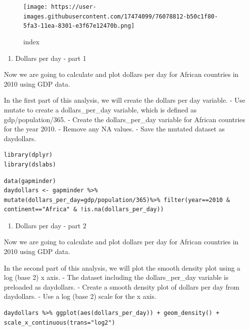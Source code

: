 \documentclass[
]{article}
\providecommand{\tightlist}{%
  \setlength{\itemsep}{0pt}\setlength{\parskip}{0pt}}
\begin{document}
\begin{figure}
\centering
\texttt{[image: https://user-images.githubusercontent.com/17474099/76078812-b50c1f80-5fa3-11ea-8301-e3f67e12470b.png]}
\caption{index}
\end{figure}

\begin{enumerate}
\def\labelenumi{\arabic{enumi}.}
\setcounter{enumi}{6}
\tightlist
\item
  Dollars per day - part 1
\end{enumerate}

Now we are going to calculate and plot dollars per day for African
countries in 2010 using GDP data.

In the first part of this analysis, we will create the dollars per day
variable. - Use mutate to create a dollars\_per\_day variable, which is
defined as gdp/population/365. - Create the dollars\_per\_day variable
for African countries for the year 2010. - Remove any NA values. - Save
the mutated dataset as daydollars.

\begin{verbatim}
library(dplyr)
library(dslabs)
\end{verbatim}

\begin{verbatim}
data(gapminder)
daydollars <- gapminder %>% mutate(dollars_per_day=gdp/population/365)%>% filter(year==2010 & continent=="Africa" & !is.na(dollars_per_day))
\end{verbatim}

\begin{enumerate}
\def\labelenumi{\arabic{enumi}.}
\setcounter{enumi}{7}
\tightlist
\item
  Dollars per day - part 2
\end{enumerate}

Now we are going to calculate and plot dollars per day for African
countries in 2010 using GDP data.

In the second part of this analysis, we will plot the smooth density
plot using a log (base 2) x axis. - The dataset including the
dollars\_per\_day variable is preloaded as daydollars. - Create a smooth
density plot of dollars per day from daydollars. - Use a log (base 2)
scale for the x axis.

\begin{verbatim}
daydollars %>% ggplot(aes(dollars_per_day)) + geom_density() + scale_x_continuous(trans="log2")
\end{verbatim}
\end{document}
